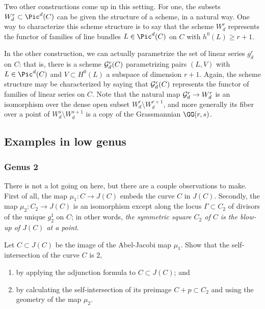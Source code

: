 Two other constructions come up in this setting. For one, the subsets $W^r_d \subset \Pic^d(C)$ can be given the structure of a scheme, in a natural way. One way to characterize this scheme structure is to say that the scheme $W^r_d$ represents the functor of families of line bundles $L \in \Pic^d(C)$ on $C$ with  $h^0(L) \geq r+1$.

In the other construction, we can actually parametrize the set of linear series $g^r_d$ on $C$: that is, there is a scheme  $\cG^r_d(C)$ parametrizing pairs $(L, V)$ with $L \in \Pic^d(C)$ and $V \subset H^0(L)$ a subspace of dimension $r+1$. Again, the scheme structure may be characterized by saying that $\cG^r_d(C)$ represents the functor of families of linear series on $C$. Note that the natural map $\cG^r_d \to W^r_d$ is an isomorphism over the dense open subset $W^r_d \setminus W^{r+1}_d$, and more generally its fiber over a point of $W^s_d \setminus W^{s+1}_d$ is a copy of  the Grassmannian $\GG(r, s)$. 



\subsection{Examples in low genus}

\subsubsection{Genus 2} There is not a lot going on here, but there are a couple observations to make. First of all, the map $\mu_1 : C \to J(C)$ embeds the curve $C$ in $J(C)$. Secondly, the map $\mu_2 : C_2 \to J(C)$ is an isomorphism except along the locus $\Gamma \subset C_2$ of divisors of the unique $g^1_2$ on $C$; in other words, \emph{the symmetric square $C_2$ of $C$ is the blow-up of $J(C)$ at a point}.

\begin{exercise}
Let $C \subset J(C)$ be the image of the Abel-Jacobi map $\mu_1$. Show that the self-intersection of the curve $C$ is 2,
\begin{enumerate}
\item by applying the adjunction formula to $C \subset J(C)$; and
\item by calculating the self-intersection of its preimage $C + p \subset C_2$ and using the geometry of the map $\mu_2$.
\end{enumerate}
\end{exercise}

